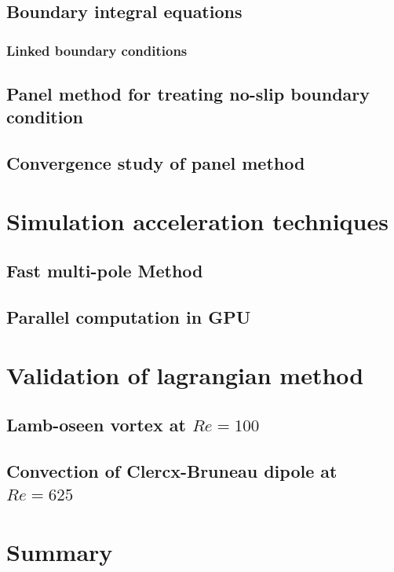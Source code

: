 \subsection{Boundary integral equations}
%
\subsubsection{Linked boundary conditions}
%
\subsection{Panel method for treating no-slip boundary condition}
%
\subsection{Convergence study of panel method}
%
\section{Simulation acceleration techniques}
\label{sec:sat}
%
\subsection{Fast multi-pole Method}
%
\subsection{Parallel computation in GPU}
%
\section{Validation of lagrangian method}

\subsection{Lamb-oseen vortex at $Re=100$}
%
\subsection{Convection of Clercx-Bruneau dipole at $Re=625$}
%
\section{Summary}
%
